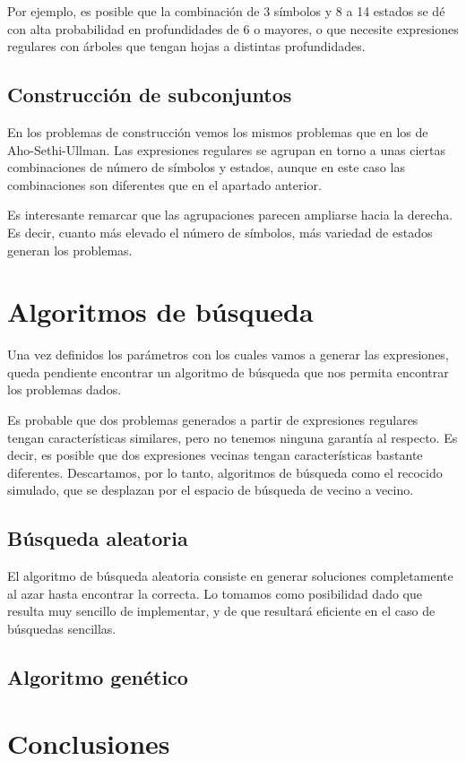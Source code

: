 Por ejemplo, es posible que la combinación de 3 símbolos y 8 a 14 estados se dé con alta probabilidad en profundidades de 6 o mayores, o que necesite expresiones regulares con árboles que tengan hojas a distintas profundidades.

\subsection{Construcción de subconjuntos}

En los problemas de construcción vemos los mismos problemas que en los de Aho-Sethi-Ullman.
Las expresiones regulares se agrupan en torno a unas ciertas combinaciones de número de símbolos y estados, aunque en este caso las combinaciones son diferentes que en el apartado anterior.


Es interesante remarcar que las agrupaciones parecen ampliarse hacia la derecha.
Es decir, cuanto más elevado el número de símbolos, más variedad de estados generan los problemas.

\section{Algoritmos de búsqueda}

Una vez definidos los parámetros con los cuales vamos a generar las expresiones, queda pendiente encontrar un algoritmo de búsqueda que nos permita encontrar los problemas dados.

Es probable que dos problemas generados a partir de expresiones regulares tengan características similares, pero no tenemos ninguna garantía al respecto.
Es decir, es posible que dos expresiones vecinas tengan características bastante diferentes.
Descartamos, por lo tanto, algoritmos de búsqueda como el recocido simulado, que se desplazan por el espacio de búsqueda de vecino a vecino.

\subsection{Búsqueda aleatoria}

El algoritmo de búsqueda aleatoria consiste en generar soluciones completamente al azar hasta encontrar la correcta.
Lo tomamos como posibilidad dado que resulta muy sencillo de implementar, y de que resultará eficiente en el caso de búsquedas sencillas.


\subsection{Algoritmo genético}


\section{Conclusiones}

